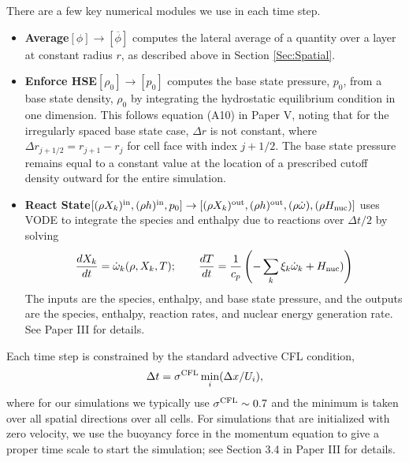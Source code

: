 There are a few key numerical modules we use in each time step.
\begin{itemize}
\item {\bf Average}$[\phi]\rightarrow[\overline\phi]$ computes the lateral average of a quantity over a layer at constant radius $r$, as described above in Section \ref{Sec:Spatial}.
\item {\bf Enforce HSE}$[\rho_0]\rightarrow[p_0]$ computes the base state pressure, $p_0$, from a base state density, $\rho_0$ by integrating the hydrostatic equilibrium condition in one dimension. 
This follows equation (A10) in Paper V, noting that for the irregularly spaced base state case, $\Delta r$ is not constant, where $\Delta r_{j+1/2} = r_{j+1} - r_j$ for cell face with index $j+1/2$.  
The base state pressure remains equal to a constant value at the location of a prescribed cutoff density outward for the entire simulation.
\item {\bf React State}$[(\rho X_k)^{\rm in},(\rho h)^{\rm in},p_0]\rightarrow[(\rho X_k)^{\rm out},(\rho h)^{\rm out},(\rho\dot\omega),(\rho H_{\rm nuc})]$ 
uses 
VODE \citep{vode} 
to integrate the species and enthalpy due to reactions over $\Delta t/2$ by solving
\begin{equation}
\frac{dX_k}{dt} = \dot\omega_k(\rho,X_k,T); \qquad
\frac{dT}{dt} = \frac{1}{c_p}\left(-\sum_k\xi_k\dot\omega_k + H_{\rm nuc})\right)
\end{equation}
The inputs are the species, enthalpy, and base state pressure, and the outputs are the species, enthalpy, reaction rates, and nuclear energy generation rate.
See Paper III for details.
\end{itemize}
Each time step is constrained by the standard advective CFL condition,
\begin{equation}
\Delta t = \sigma^{\rm CFL} \min_i(\Delta x / U_i),
\end{equation}
where for our simulations we typically use $\sigma^{\rm CFL}\sim 0.7$ and the minimum is taken over all spatial directions over all cells.
{For simulations that are initialized with zero velocity, we use the buoyancy force in the momentum equation to give a proper time scale
to start the simulation;} see Section 3.4 in Paper III for details.


